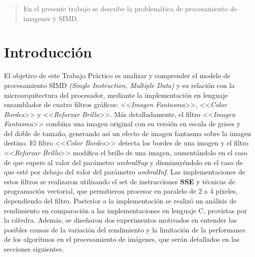 \documentclass[a4paper]{article}
\begin{document}
\thispagestyle{empty}

\maketitle
\newpage

\thispagestyle{empty}
\vfill
\begin{abstract}
En el presente trabajo se describe la problemática de procesamiento de imagenes y SIMD.
\end{abstract}

\thispagestyle{empty}
\vspace{3cm}
\tableofcontents
\newpage


\newpage

\section{Introducción}

\justify
El objetivo de este Trabajo Práctico es analizar y comprender el modelo de procesamiento SIMD \textit{(Single Instruction, Multiple Data)} y su relación con la microarquitectura del procesador, mediante la implementación en lenguaje ensamblador de cuatro filtros gráficos: <<\textit{Imagen Fantasma}>>, <<\textit{Color Bordes}>> y <<\textit{Reforzar Brillo}>>. 
\justify
Más detalladamente, el filtro <<\textit{Imagen Fantasma}>> combina una imagen original con su versión en escala de grises y del doble de tamaño, generando así un  efecto de imagen fantasma sobre la imagen destino. El filtro <<\textit{Color Bordes}>> detecta los bordes de una  imagen y el filtro <<\textit{Reforzar Brillo}>> modifica el brillo de una imagen, aumentándolo en el caso de que  supere al valor del parámetro \textit{umbralSup} y disminuyéndolo en el caso de que esté por debajo del valor  del parámetro \textit{umbralInf}.
\justify
\indent Las implementaciones de estos filtros se realizaron utilizando el set de instrucciones \textbf{SSE} y técnicas de programación vectorial, que permitieron procesar en paralelo de 2 a 4 píxeles, dependiendo del filtro. Posterior a la implementación se realizó un análisis de rendimiento en comparación a las implementaciones en lenguaje C, provistas por la cátedra. Además, se diseñaron dos experimentos motivados en entender las posibles causas de la variación del rendimiento y la limitación de la performance de los algoritmos en el procesamiento de imágenes, que serán detallados en las secciones siguientes.  
\end{document}
